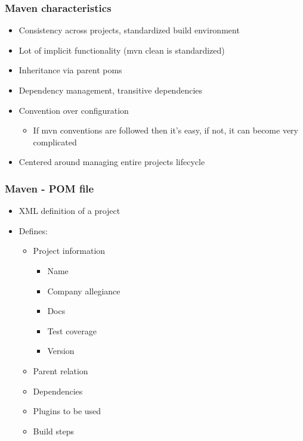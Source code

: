 \begin{frame}
\frametitle{Maven characteristics}
\begin{itemize}
	\item Consistency across projects, standardized build environment
	\item Lot of implicit functionality (mvn clean is standardized)
	\item Inheritance via parent poms
	\item Dependency management, transitive dependencies
	\item Convention over configuration
		\begin{itemize}
		\item If mvn conventions are followed then it's easy, if not, it can become very complicated
		\end{itemize}
	\item Centered around managing entire projects lifecycle
\end{itemize}
\end{frame}

\begin{frame}
\frametitle{Maven - POM file}
\begin{itemize}
	\item XML definition of a project
	\item Defines:
		\begin{itemize}
		\item Project information 
			\begin{itemize}
			\item Name
			\item Company allegiance
			\item Docs
			\item Test coverage
			\item Version
			\end{itemize}
		\item Parent relation
		\item Dependencies
		\item Plugins to be used
		\item Build steps
		\end{itemize}
\end{itemize}
\end{frame}

